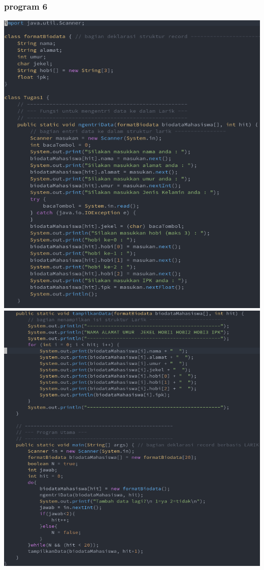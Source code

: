 \documentclass[a4paper,12pt]{article}
\begin{document}
\subsubsection{program 6}
\begin{center}
    \includegraphics[scale=.5]{code10.png} 
    \newpage
    \includegraphics[scale=.5]{code11.png} 
\end{center}
\end{document}
